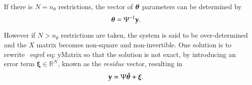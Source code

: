 
If there is $N=n_\theta$ restrictions, the vector of $\bm{\theta}$ parameters can be determined by
\begin{equation}
   \bm{\theta} = \Psi^{-1}\mathrm{\mathbf{y}}
   \label{eq:thetaest}.
\end{equation}

However if $N > n_\theta$ restrictions are taken, the system is said to be over-determined and the $X$ matrix becomes non-square and non-invertible. One solution is to rewrite \ eqref {eq: yMatrix} so that the solution is not exact, by introducing an error term $\bm{\xi} \in \mathbb{R}^N$, known as the \emph{residue} vector, resulting in
\begin{equation} 
   \label{eq:ysobredet}
   \mathrm{\mathbf{y}} =  \Psi\hat{\bm{\theta}} + \bm{\xi}.
\end{equation}

